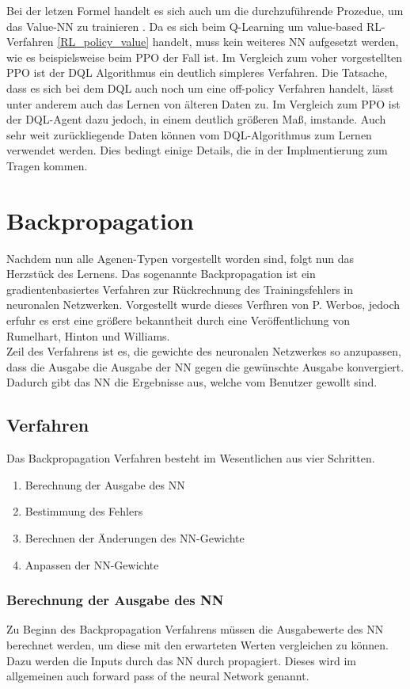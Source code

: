Bei der letzen Formel handelt es sich auch um die durchzuführende Prozedue, um das Value-NN zu trainieren \cite{DRL}.
Da es sich beim Q-Learning um value-based RL-Verfahren \ref{RL_policy_value} handelt, muss kein weiteres NN aufgesetzt werden, wie es beispielsweise beim PPO der Fall ist. Im Vergleich zum voher vorgestellten PPO ist der DQL Algorithmus ein deutlich simpleres Verfahren. Die Tatsache, dass es sich bei dem DQL auch noch um eine off-policy Verfahren handelt, lässt unter anderem auch das Lernen von älteren Daten zu. Im Vergleich zum PPO ist der DQL-Agent dazu jedoch, in einem deutlich größeren Maß, imstande. Auch sehr weit zurückliegende Daten können vom DQL-Algorithmus zum Lernen verwendet werden. Dies bedingt einige Details, die in der Implmentierung zum Tragen kommen.\\

\section{Backpropagation}
Nachdem nun alle Agenen-Typen vorgestellt worden sind, folgt nun das Herzstück des Lernens. Das sogenannte Backpropagation ist ein gradientenbasiertes Verfahren zur Rückrechnung des Trainingsfehlers in neuronalen Netzwerken. Vorgestellt wurde dieses Verfhren von P. Werbos, jedoch erfuhr es erst eine größere bekanntheit durch eine Veröffentlichung von Rumelhart, Hinton und Williams.\\
Zeil des Verfahrens ist es, die gewichte des neuronalen Netzwerkes so anzupassen, dass die Ausgabe die Ausgabe der NN gegen die gewünschte Ausgabe konvergiert. Dadurch gibt das NN die Ergebnisse aus, welche vom Benutzer gewollt sind.

\subsection{Verfahren}
Das Backpropagation Verfahren besteht im Wesentlichen aus vier Schritten.
\begin{enumerate}
	\item Berechnung der Ausgabe des NN
	\item Bestimmung des Fehlers 
	\item Berechnen der Änderungen des NN-Gewichte
	\item Anpassen der NN-Gewichte
\end{enumerate}

\subsubsection{Berechnung der Ausgabe des NN}
Zu Beginn des Backpropagation Verfahrens müssen die Ausgabewerte des NN berechnet werden, um diese mit den erwarteten Werten vergleichen zu können. Dazu werden die Inputs durch das NN durch propagiert. Dieses wird im allgemeinen auch forward pass of the neural Network genannt.

